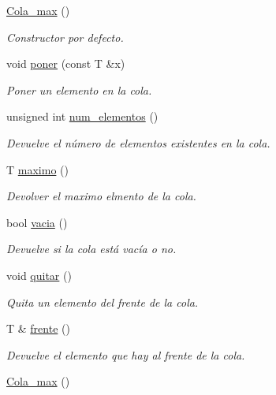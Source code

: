\begin{DoxyCompactItemize}
\item 
\mbox{\hyperlink{class_cola__max_af9a05d272cd9447f8ac449e8703c8ecb}{Cola\+\_\+max}} ()
\begin{DoxyCompactList}\small\item\em Constructor por defecto. \end{DoxyCompactList}\item 
void \mbox{\hyperlink{class_cola__max_a7cf38998ed54e19bf698fb4180cf4506}{poner}} (const T \&x)
\begin{DoxyCompactList}\small\item\em Poner un elemento en la cola. \end{DoxyCompactList}\item 
unsigned int \mbox{\hyperlink{class_cola__max_aa3ece318ef28ed910c378f33e9a1d172}{num\+\_\+elementos}} ()
\begin{DoxyCompactList}\small\item\em Devuelve el número de elementos existentes en la cola. \end{DoxyCompactList}\item 
T \mbox{\hyperlink{class_cola__max_a3df6075351dfd7c9e9a436a6d430e170}{maximo}} ()
\begin{DoxyCompactList}\small\item\em Devolver el maximo elmento de la cola. \end{DoxyCompactList}\item 
bool \mbox{\hyperlink{class_cola__max_af0b18f86af91ef94d7a035f87a4dcb2b}{vacia}} ()
\begin{DoxyCompactList}\small\item\em Devuelve si la cola está vacía o no. \end{DoxyCompactList}\item 
void \mbox{\hyperlink{class_cola__max_a21f1d915c674522d438f8288177e7ecb}{quitar}} ()
\begin{DoxyCompactList}\small\item\em Quita un elemento del frente de la cola. \end{DoxyCompactList}\item 
T \& \mbox{\hyperlink{class_cola__max_ad24d6ded47e7696c53dd10e33cce403e}{frente}} ()
\begin{DoxyCompactList}\small\item\em Devuelve el elemento que hay al frente de la cola. \end{DoxyCompactList}\item 
\mbox{\hyperlink{class_cola__max_af9a05d272cd9447f8ac449e8703c8ecb}{Cola\+\_\+max}} ()

\end{DoxyCompactItemize}
